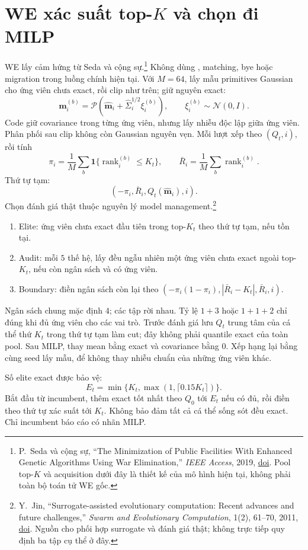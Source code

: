 \documentclass[11pt,a4paper]{article}
\newcommand{\ind}{\mathbf1}
\newcommand{\rank}{\operatorname{rank}}
\newcommand{\code}[1]{\texttt{\detokenize{#1}}}
\begin{document}
\section{WE xác suất top-$K$ và chọn đi MILP}
WE lấy cảm hứng từ Seda và cộng sự.\footnote{P.~Seda và cộng sự, ``The Minimization of Public Facilities With Enhanced Genetic Algorithms Using War Elimination,'' \emph{IEEE Access}, 2019, \href{https://doi.org/10.1109/ACCESS.2019.2891424}{doi}. Pool top-$K$ và acquisition dưới đây là thiết kế của mô hình hiện tại, không phải toàn bộ toán tử WE gốc.}
Không dùng \code{minimum_gap_pairs()}, matching, bye hoặc migration trong luồng chính hiện tại.
Với $M=64$, lấy mẫu primitives Gaussian cho ứng viên chưa exact, rồi clip như trên; giữ nguyên exact:
\[
\mathbf m_i^{(b)}=\mathcal P(\widehat{\mathbf m}_i+\widehat\Sigma_i^{1/2}\xi_i^{(b)}),
\qquad \xi_i^{(b)}\sim\mathcal N(0,I).
\]
Code giữ covariance trong từng ứng viên, nhưng lấy nhiễu độc lập giữa ứng viên. Phân phối sau clip không còn Gaussian nguyên vẹn.
Mỗi lượt xếp theo $(Q_t,i)$, rồi tính
\[
\pi_i=\frac1M\sum_b\ind\{\rank_i^{(b)}\le K_t\},\qquad
\bar R_i=\frac1M\sum_b\rank_i^{(b)}.
\]
Thứ tự tạm:
\[
(-\pi_i,\bar R_i,Q_t(\widehat{\mathbf m}_i),i).
\]
Chọn đánh giá thật thuộc nguyên lý model management.\footnote{Y.~Jin, ``Surrogate-assisted evolutionary computation: Recent advances and future challenges,'' \emph{Swarm and Evolutionary Computation}, 1(2), 61--70, 2011, \href{https://doi.org/10.1016/j.swevo.2011.05.001}{doi}. Nguồn cho phối hợp surrogate và đánh giá thật; không trực tiếp quy định ba tập cụ thể ở đây.}
\begin{enumerate}
\item Elite: ứng viên chưa exact đầu tiên trong top-$K_t$ theo thứ tự tạm, nếu tồn tại.
\item Audit: mỗi $5$ thế hệ, lấy đều ngẫu nhiên một ứng viên chưa exact ngoài top-$K_t$, nếu còn ngân sách và có ứng viên.
\item Boundary: điền ngân sách còn lại theo
$(-\pi_i(1-\pi_i),|\bar R_i-K_t|,\bar R_i,i)$.
\end{enumerate}
Ngân sách chung mặc định $4$; các tập rời nhau. Tỷ lệ $1+3$ hoặc $1+1+2$ chỉ đúng khi đủ ứng viên cho các vai trò.
Trước đánh giá lưu $Q_t$ trung tâm của cá thể thứ $K_t$ trong thứ tự tạm làm cut; đây không phải quantile exact của toàn pool.
Sau MILP, thay mean bằng exact và covariance bằng $0$. Xếp hạng lại bằng cùng seed lấy mẫu, để không thay nhiễu chuẩn của những ứng viên khác.

Số elite exact được bảo vệ:
\[
E_t=\min\{K_t,\max(1,\lceil0.15K_t\rceil)\}.
\]
Bắt đầu từ incumbent, thêm exact tốt nhất theo $Q_0$ tới $E_t$ nếu có đủ, rồi điền theo thứ tự xác suất tới $K_t$.
Không bảo đảm tất cả cá thể sống sót đều exact. Chỉ incumbent báo cáo có nhãn MILP.
\end{document}
